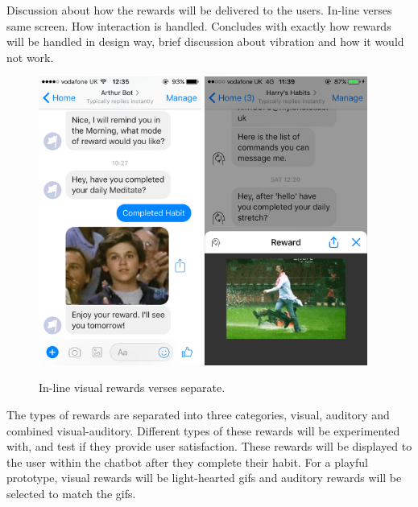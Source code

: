 Discussion about how the rewards will be delivered to the users. In-line verses same screen. How interaction is handled. Concludes with exactly how rewards will be handled in design way, brief discussion about vibration and how it would not work.

\begin{figure}[H]
  \centering
  \includegraphics[width=2.1in]{../resources/design/reward-visual-inline.png}
  \hspace{10px}
  \includegraphics[width=2.1in]{../resources/design/reward-visual-2.png}
  \caption{In-line visual rewards verses separate.}
  \label{fig:rewards_inline_v_website}
\end{figure}

The types of rewards are separated into three categories, visual, auditory and combined visual-auditory. Different types of these rewards will be experimented with,
and test if they provide user satisfaction. These rewards will be displayed to the user within the chatbot after they complete their habit.
For a playful prototype, visual rewards will be light-hearted gifs and auditory rewards will be selected to match the gifs.

